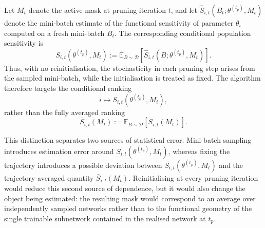 \documentclass{article}
\theoremstyle{definition}
\theoremstyle{remark}
\begin{document}
Let $M_t$ denote the active mask at pruning iteration $t$, and let
$\widehat S_{i,t}(B_t;\theta^{(t_p)},M_t)$ denote the mini-batch estimate of the
functional sensitivity of parameter $\theta_i$ computed on a fresh mini-batch
$B_t$. The corresponding conditional population sensitivity is
\begin{equation}
    S_{i,t}(\theta^{(t_p)},M_t)
    :=
    \mathbb E_{B \sim \mathcal D}
    \left[
        \widehat S_{i,t}(B;\theta^{(t_p)},M_t)
    \right].
\end{equation}
Thus, with no reinitialisation, the stochasticity in each pruning step arises
from the sampled mini-batch, while the initialisation is treated as fixed. The
algorithm therefore targets the conditional ranking
\begin{equation}
    i \mapsto S_{i,t}(\theta^{(t_p)},M_t),
\end{equation}
rather than the fully averaged ranking
\begin{equation}
    \bar S_{i,t}(M_t)
    :=
    \mathbb E_{B \sim \mathcal D}
    \left[
        S_{i,t}(M_t)
    \right].
\end{equation}

This distinction separates two sources of statistical error. Mini-batch sampling
introduces estimation error around $S_{i,t}(\theta^{(t_p)},M_t)$, whereas fixing
the trajectory introduces a possible deviation between
$S_{i,t}(\theta^{(t_p)},M_t)$ and the trajectory-averaged quantity
$\bar S_{i,t}(M_t)$. Reinitialising at every pruning iteration would reduce this
second source of dependence, but it would also change the object being estimated:
the resulting mask would correspond to an average over independently sampled
networks rather than to the functional geometry of the single trainable
subnetwork contained in the realised network at $t_p$.
\end{document}
